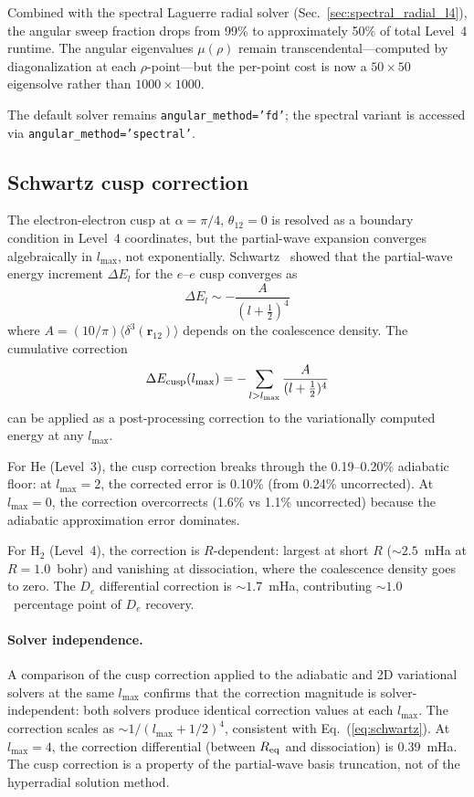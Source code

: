 \documentclass[aps,pra,twocolumn,superscriptaddress,longbibliography]{revtex4-2}
\begin{document}
Combined with the spectral Laguerre radial solver
(Sec.~\ref{sec:spectral_radial_l4}), the angular sweep fraction
drops from 99\% to approximately 50\% of total Level~4 runtime.
The angular eigenvalues $\mu(\rho)$ remain transcendental---computed
by diagonalization at each $\rho$-point---but the per-point cost
is now a $50 \times 50$ eigensolve rather than
$1000 \times 1000$.

The default solver remains \texttt{angular\_method='fd'};
the spectral variant is accessed via
\texttt{angular\_method='spectral'}.

\subsection{Schwartz cusp correction}
\label{sec:cusp_correction}

The electron-electron cusp at $\alpha = \pi/4$, $\theta_{12} = 0$
is resolved as a boundary condition in Level~4 coordinates, but the
partial-wave expansion converges algebraically in $l_{\max}$, not
exponentially.  Schwartz~\cite{schwartz1962} showed that the
partial-wave energy increment $\Delta E_l$ for the $e$--$e$ cusp
converges as
\begin{equation}
  \Delta E_l \sim -\frac{A}{(l + \tfrac{1}{2})^4}
  \label{eq:schwartz}
\end{equation}
where $A = (10/\pi)\langle\delta^3(\bm{r}_{12})\rangle$ depends on
the coalescence density.  The cumulative correction
\begin{equation}
  \Delta E_{\rm cusp}(l_{\max})
    = -\sum_{l > l_{\max}} \frac{A}{(l + \tfrac{1}{2})^4}
  \label{eq:cusp_sum}
\end{equation}
can be applied as a post-processing correction to the variationally
computed energy at any $l_{\max}$.

For He (Level~3), the cusp correction breaks through the
0.19--0.20\% adiabatic floor: at $l_{\max} = 2$, the corrected
error is 0.10\% (from 0.24\% uncorrected).  At $l_{\max} = 0$,
the correction overcorrects (1.6\% vs 1.1\% uncorrected)
because the adiabatic approximation error dominates.

For H$_2$ (Level~4), the correction is $R$-dependent: largest at
short $R$ (${\sim}2.5$~mHa at $R = 1.0$~bohr) and vanishing at
dissociation, where the coalescence density goes to zero.  The
$D_e$ differential correction is ${\sim}1.7$~mHa, contributing
${\sim}1.0$~percentage point of $D_e$ recovery.

\paragraph{Solver independence.}
A comparison of the cusp correction applied to the adiabatic and 2D
variational solvers at the same $l_{\max}$ confirms that the
correction magnitude is solver-independent: both solvers produce
identical correction values at each $l_{\max}$.  The correction
scales as ${\sim}1/(l_{\max} + 1/2)^4$, consistent with Eq.~(\ref{eq:schwartz}).
At $l_{\max} = 4$, the correction differential (between $R_{\rm eq}$ and
dissociation) is 0.39~mHa.  The cusp correction is a property of the
partial-wave basis truncation, not of the hyperradial solution method.
\end{document}
